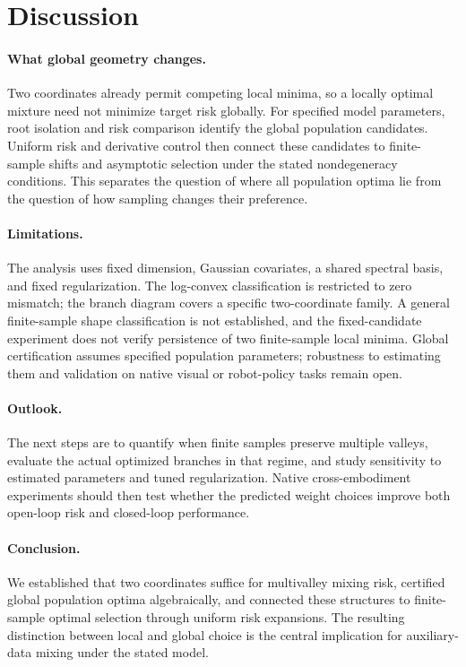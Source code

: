 \section{Discussion}
\label{sec:discussion}

\paragraph{What global geometry changes.}
Two coordinates already permit competing local minima, so a locally optimal mixture need not minimize target risk globally. For specified model parameters, root isolation and risk comparison identify the global population candidates. Uniform risk and derivative control then connect these candidates to finite-sample shifts and asymptotic selection under the stated nondegeneracy conditions. This separates the question of where all population optima lie from the question of how sampling changes their preference.

\paragraph{Limitations.}
The analysis uses fixed dimension, Gaussian covariates, a shared spectral basis, and fixed regularization. The log-convex classification is restricted to zero mismatch; the branch diagram covers a specific two-coordinate family. A general finite-sample shape classification is not established, and the fixed-candidate experiment does not verify persistence of two finite-sample local minima. Global certification assumes specified population parameters; robustness to estimating them and validation on native visual or robot-policy tasks remain open.

\paragraph{Outlook.}
The next steps are to quantify when finite samples preserve multiple valleys, evaluate the actual optimized branches in that regime, and study sensitivity to estimated parameters and tuned regularization. Native cross-embodiment experiments should then test whether the predicted weight choices improve both open-loop risk and closed-loop performance.

\paragraph{Conclusion.}
We established that two coordinates suffice for multivalley mixing risk, certified global population optima algebraically, and connected these structures to finite-sample optimal selection through uniform risk expansions. The resulting distinction between local and global choice is the central implication for auxiliary-data mixing under the stated model.
